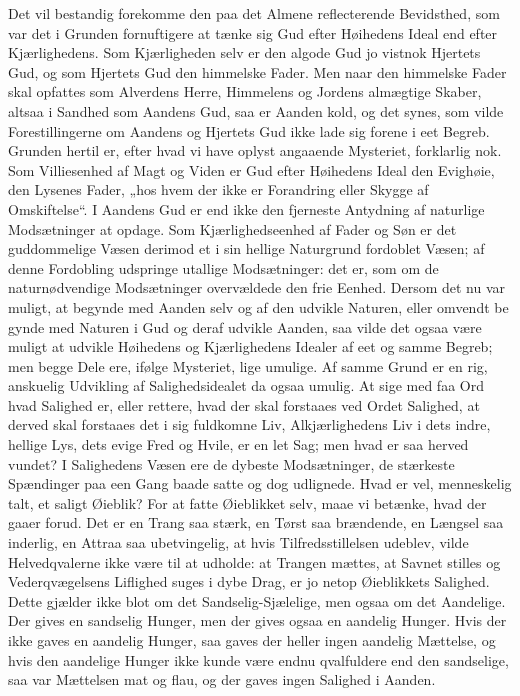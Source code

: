 \documentclass[12pt]{book}
\begin{document}
Det vil bestandig forekomme den paa det Almene reflecterende
Bevidsthed, som var det i Grunden fornuftigere at tænke sig Gud
efter Høihedens Ideal end efter Kjærlighedens. Som Kjærligheden selv
er den algode Gud jo vistnok Hjertets Gud, og som Hjertets Gud den
himmelske Fader. Men naar den himmelske Fader skal opfattes som
Alverdens Herre, Himmelens og Jordens almægtige Skaber, altsaa i
Sandhed som Aandens Gud, saa er Aanden kold, og det synes, som vilde
Forestillingerne om Aandens og Hjertets Gud ikke lade sig forene i
eet Begreb. Grunden hertil er, efter hvad vi have oplyst angaaende
Mysteriet, forklarlig nok. Som Villiesenhed af Magt og Viden er Gud
efter Høihedens Ideal den Evighøie, den Lysenes Fader, „hos hvem der
ikke er Forandring eller Skygge af Omskiftelse“. I Aandens Gud er
end ikke den fjerneste Antydning af naturlige Modsætninger at
opdage. Som Kjærlighedseenhed af Fader og Søn er det guddommelige
Væsen derimod et i sin hellige Naturgrund fordoblet Væsen; af denne
Fordobling udspringe utallige Modsætninger: det er, som om de
naturnødvendige Modsætninger overvældede den frie Eenhed. Dersom det
nu var muligt, at begynde med Aanden selv og af den udvikle Naturen,
eller omvendt be\-
gynde med Naturen i Gud og deraf udvikle Aanden, saa vilde det ogsaa
være muligt at udvikle Høihedens og Kjærlighedens Idealer af eet og
samme Begreb; men begge Dele ere, ifølge Mysteriet, lige umulige. Af
samme Grund er en rig, anskuelig Udvikling af Salighedsidealet da
ogsaa umulig. At sige med faa Ord hvad Salighed er, eller rettere,
hvad der skal forstaaes ved Ordet Salighed, at derved skal forstaaes
det i sig fuldkomne Liv, Alkjærlighedens Liv i dets indre, hellige
Lys, dets evige Fred og Hvile, er en let Sag; men hvad er saa herved
vundet? I Salighedens Væsen ere de dybeste Modsætninger, de
stærkeste Spændinger paa een Gang baade satte og dog udlignede. Hvad
er vel, menneskelig talt, et saligt Øieblik? For at fatte Øieblikket
selv, maae vi betænke, hvad der gaaer forud. Det er en Trang saa
stærk, en Tørst saa brændende, en Længsel saa inderlig, en Attraa
saa ubetvingelig, at hvis Tilfredsstillelsen udeblev, vilde
Helvedqvalerne ikke være til at udholde: at Trangen mættes, at
Savnet stilles og Vederqvægelsens Liflighed suges i dybe Drag, er jo
netop Øieblikkets Salighed. Dette gjælder ikke blot om det
Sandselig-Sjælelige, men ogsaa om det Aandelige. Der gives en
sandselig Hunger, men der gives ogsaa en aandelig Hunger. Hvis der
ikke gaves en aandelig Hunger, saa gaves der heller ingen aandelig
Mættelse, og hvis den aandelige Hunger ikke kunde være endnu
qvalfuldere end den sandselige, saa var Mættelsen mat og flau, og
der gaves ingen Salighed i Aanden.
\end{document}
